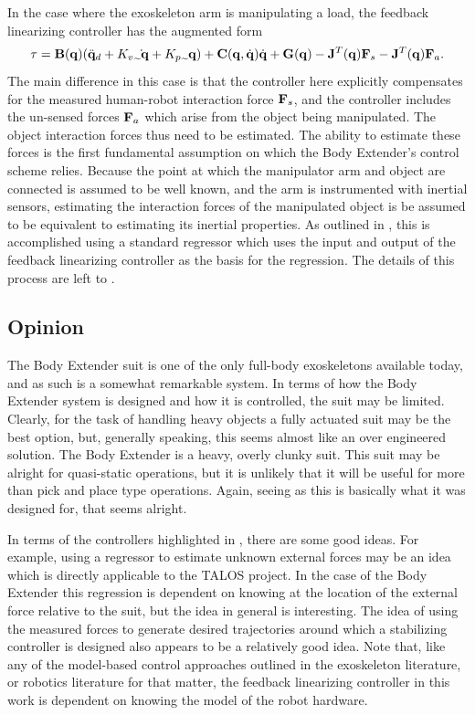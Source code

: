 In the case where the exoskeleton arm is manipulating a load, the feedback linearizing controller has the augmented form
\begin{equation}
{\bf \tau} = \mB(\vq)(\ddot{\vq}_d + K_v \dot{\tilde{\vq}} + K_p \tilde{\vq}) + \mC(\vq,\dot{\vq})\dot{\vq} + \mG(\vq) -\mJ^T(\vq) \vF_s -\mJ^T(\vq)\vF_a. \notag
\end{equation}
The main difference in this case is that the controller here explicitly compensates for the measured human-robot interaction force ${\bf F}_s$, and the controller includes the un-sensed forces ${\bf F}_a$ which arise from the object being manipulated.  The object interaction forces thus need to be estimated.  The ability to estimate these forces is the first fundamental assumption on which the Body Extender's control scheme relies.  Because the point at which the manipulator arm and object are connected is assumed to be well known, and the arm is instrumented with inertial sensors, estimating the interaction forces of the manipulated object is be assumed to be equivalent to estimating its inertial properties.  As outlined in \cite{}, this is accomplished using a standard regressor which uses the input and output of the feedback linearizing controller as the basis for the regression.  The details of this process are left to \cite{}.

 
\subsection{Opinion}

The Body Extender suit is one of the only full-body exoskeletons available today, and as such is a somewhat remarkable system. In terms of how the Body Extender system is designed and how it is controlled, the suit may be limited. Clearly, for the task of handling heavy objects a fully actuated suit may be the best option, but, generally speaking, this seems almost like an over engineered solution.  The Body Extender is a heavy, overly clunky suit.  This suit may be alright for quasi-static operations, but it is unlikely that it will be useful for more than pick and place type operations.  Again, seeing as this is basically what it was designed for, that seems alright.

In terms of the controllers highlighted in \cite{}, there are some good ideas.  For example, using a regressor to estimate unknown external forces may be an idea which is directly applicable to the TALOS project.  In the case of the Body Extender this regression is dependent on knowing at the location of the external force  relative to the suit, but the idea in general is interesting.  The idea of using the measured forces to generate desired trajectories around which a stabilizing controller is designed also appears to be a relatively good idea.  Note that, like any of the model-based control approaches outlined in the exoskeleton literature, or robotics literature for that matter, the feedback linearizing controller in this work is dependent on knowing the model of the robot hardware.  

